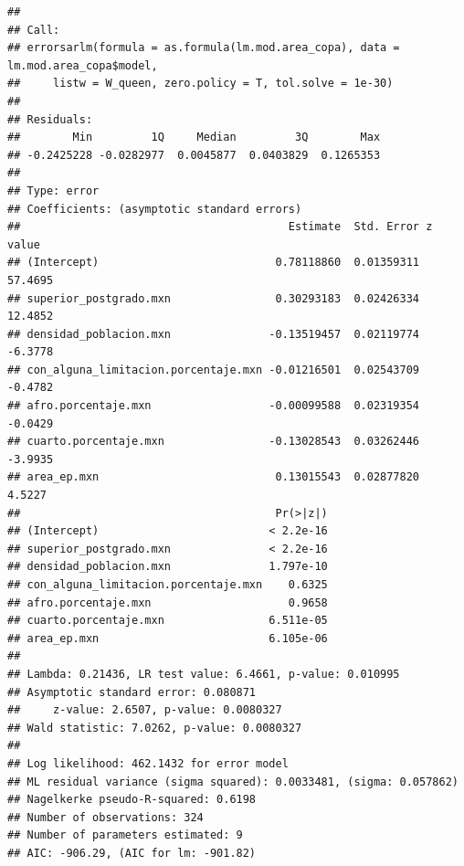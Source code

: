 \documentclass[12pt,]{book}
\newenvironment{Shaded}{\begin{snugshade}}{\end{snugshade}}
\newcommand{\KeywordTok}[1]{\textcolor[rgb]{0.13,0.29,0.53}{\textbf{#1}}}
\newcommand{\DataTypeTok}[1]{\textcolor[rgb]{0.13,0.29,0.53}{#1}}
\newcommand{\FloatTok}[1]{\textcolor[rgb]{0.00,0.00,0.81}{#1}}
\newcommand{\CommentTok}[1]{\textcolor[rgb]{0.56,0.35,0.01}{\textit{#1}}}
\newcommand{\OperatorTok}[1]{\textcolor[rgb]{0.81,0.36,0.00}{\textbf{#1}}}
\newcommand{\NormalTok}[1]{#1}
\begin{document}
\begin{Shaded}
\end{Shaded}

\begin{verbatim}
## 
## Call:
## errorsarlm(formula = as.formula(lm.mod.area_copa), data = lm.mod.area_copa$model, 
##     listw = W_queen, zero.policy = T, tol.solve = 1e-30)
## 
## Residuals:
##        Min         1Q     Median         3Q        Max 
## -0.2425228 -0.0282977  0.0045877  0.0403829  0.1265353 
## 
## Type: error 
## Coefficients: (asymptotic standard errors) 
##                                         Estimate  Std. Error z value
## (Intercept)                           0.78118860  0.01359311 57.4695
## superior_postgrado.mxn                0.30293183  0.02426334 12.4852
## densidad_poblacion.mxn               -0.13519457  0.02119774 -6.3778
## con_alguna_limitacion.porcentaje.mxn -0.01216501  0.02543709 -0.4782
## afro.porcentaje.mxn                  -0.00099588  0.02319354 -0.0429
## cuarto.porcentaje.mxn                -0.13028543  0.03262446 -3.9935
## area_ep.mxn                           0.13015543  0.02877820  4.5227
##                                       Pr(>|z|)
## (Intercept)                          < 2.2e-16
## superior_postgrado.mxn               < 2.2e-16
## densidad_poblacion.mxn               1.797e-10
## con_alguna_limitacion.porcentaje.mxn    0.6325
## afro.porcentaje.mxn                     0.9658
## cuarto.porcentaje.mxn                6.511e-05
## area_ep.mxn                          6.105e-06
## 
## Lambda: 0.21436, LR test value: 6.4661, p-value: 0.010995
## Asymptotic standard error: 0.080871
##     z-value: 2.6507, p-value: 0.0080327
## Wald statistic: 7.0262, p-value: 0.0080327
## 
## Log likelihood: 462.1432 for error model
## ML residual variance (sigma squared): 0.0033481, (sigma: 0.057862)
## Nagelkerke pseudo-R-squared: 0.6198 
## Number of observations: 324 
## Number of parameters estimated: 9 
## AIC: -906.29, (AIC for lm: -901.82)
\end{verbatim}
\end{document}
